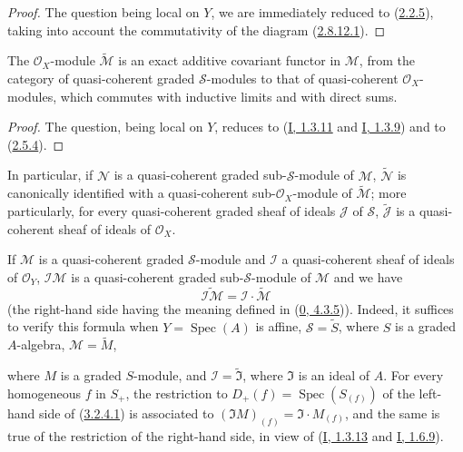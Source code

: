 \begin{proof}
The question being local on $Y$, we are immediately reduced to
(\hyperref[II.2.2.5]{2.2.5}), taking into account the commutativity of the
diagram (\hyperref[II.2.8.12.1]{2.8.12.1}).
\end{proof}

\begin{proposition}[3.2.4]
\label{II.3.2.4}
The $\mathcal{O}_X$-module $\widetilde{\mathcal{M}}$ is an exact additive
covariant functor in $\mathcal{M}$, from the category of quasi-coherent
graded $\mathcal{S}$-modules to that of quasi-coherent $\mathcal{O}_X$-modules,
which commutes with inductive limits and with direct sums.
\end{proposition}

\begin{proof}
The question, being local on $Y$, reduces to
(\hyperref[I.1.3.11]{I, 1.3.11} and
\hyperref[I.1.3.9]{I, 1.3.9}) and to
(\hyperref[II.2.5.4]{2.5.4}).
\end{proof}

In particular, if $\mathcal{N}$ is a quasi-coherent graded
sub-$\mathcal{S}$-module of $\mathcal{M}$, $\widetilde{\mathcal{N}}$ is
canonically identified with a quasi-coherent sub-$\mathcal{O}_X$-module of
$\widetilde{\mathcal{M}}$; more particularly, for every quasi-coherent graded
sheaf of ideals $\mathcal{J}$ of $\mathcal{S}$,
$\widetilde{\mathcal{J}}$ is a quasi-coherent sheaf of ideals of
$\mathcal{O}_X$.

If $\mathcal{M}$ is a quasi-coherent graded $\mathcal{S}$-module and
$\mathcal{I}$ a quasi-coherent sheaf of ideals of $\mathcal{O}_Y$,
$\mathcal{I}\mathcal{M}$ is a quasi-coherent graded sub-$\mathcal{S}$-module
of $\mathcal{M}$ and we have
\[
\label{II.3.2.4.1}
  \widetilde{\mathcal{I}\mathcal{M}}
  =\mathcal{I}\cdot\widetilde{\mathcal{M}}
\tag{3.2.4.1}
\]
(the right-hand side having the meaning defined in
(\hyperref[0.4.3.5]{0, 4.3.5})). Indeed, it suffices to verify this
formula when $Y=\operatorname{Spec}(A)$ is affine,
$\mathcal{S}=\widetilde{S}$, where $S$ is a graded $A$-algebra,
$\mathcal{M}=\widetilde{M}$,


where $M$ is a graded $S$-module, and
$\mathcal{I}=\widetilde{\mathfrak{I}}$, where $\mathfrak{I}$ is an ideal of
$A$. For every homogeneous $f$ in $S_+$, the restriction to
$D_+(f)=\operatorname{Spec}(S_{(f)})$ of the left-hand side of
(\hyperref[II.3.2.4.1]{3.2.4.1}) is associated to
$(\mathfrak{I}M)_{(f)}=\mathfrak{I}\cdot M_{(f)}$, and the same is true of
the restriction of the right-hand side, in view of
(\hyperref[I.1.3.13]{I, 1.3.13} and
\hyperref[I.1.6.9]{I, 1.6.9}).

